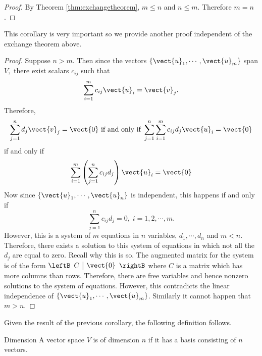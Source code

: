 \begin{proof} By Theorem \ref{thm:exchangetheorem}, $m\leq n$ and $n\leq m$. Therefore $m=n$. 
\end{proof}

This corollary is very important so we provide another proof independent of the exchange theorem above.

\begin{proof}Suppose $n > m.$ Then since the vectors $\left\{ \vect{u}
_{1},\cdots ,\vect{u}_{m}\right\} $ span $V,$ there exist scalars $c_{ij}$
such that 
\begin{equation*}
\sum_{i=1}^{m}c_{ij}\vect{u}_{i}=\vect{v}_{j}.
\end{equation*}
Therefore, 
\begin{equation*}
\sum_{j=1}^{n}d_{j}\vect{v}_{j}=\vect{0}
\text{ if and only if }\sum_{j=1}^{n}\sum_{i=1}^{m}c_{ij}d_{j}\vect{u}_{i}=
\vect{0}
\end{equation*}
if and only if 
\begin{equation*}
\sum_{i=1}^{m}\left( \sum_{j=1}^{n}c_{ij}d_{j}\right) \vect{u}_{i}=\vect{
0}
\end{equation*}
Now since $\{\vect{u}_{1},\cdots ,\vect{u}_{n}\}$ is independent, this
happens if and only if 
\begin{equation*}
\sum_{j=1}^{n}c_{ij}d_{j}=0,\;i=1,2,\cdots ,m.
\end{equation*}
However, this is a system of $m$ equations in $n$ variables, $d_{1},\cdots
,d_{n}$ and $m<n.$ Therefore, there exists a solution to this system of
equations in which not all the $d_{j}$ are equal to zero. Recall why this is
so. The augmented matrix for the system is of the form 
$\leftB 
\begin{array}{c|c}
C & \vect{0}
\end{array}
\rightB $ where $C$ is a matrix which has more columns than rows. Therefore,
there are free variables and hence nonzero solutions to the system of
equations. However, this contradicts the linear independence of $\left\{ 
\vect{u}_{1},\cdots ,\vect{u}_{m}\right\} $. Similarly it cannot happen
that $m > n$.
\end{proof}

Given the result of the previous corollary, the following definition follows.

\begin{definition}{Dimension}\label{def:dimensionvectorspace}
 A vector space $V$ is of dimension $n$ if it has a basis consisting of $n$ vectors. 
\end{definition}

